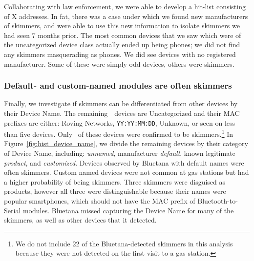 Collaborating with law
enforcement, we were able to develop a hit-list consisting of X addresses. In
fat, there was a case under which we found new manufacturers of skimmers, and
were able to use this new information to isolate skimmers we had seen 7 months
prior. The most common devices that we saw which were of the uncategorized
device class actually ended up being phones; we did not find any skimmers
masquerading as phones. We did see devices with no registered manufacturer. Some
of these were simply odd devices, others were skimmers.
\fi

\subsubsection*{Default- and custom-named modules are often skimmers} %

Finally, we investigate if skimmers can be differentiated from other devices by
their Device Name.
%
The remaining~\numberBTMACCoDfiltered~devices are Uncategorized and their MAC prefixes are either: Roving Networks, \texttt{YY:YY:MM:DD}, Unknown, or seen on less than five devices.
%
Only
\totalskimmersfirstvisit~of these devices were confirmed to be
skimmers.\footnote{We do not include 22 of the Bluetana-detected skimmers in
this analysis because they were not detected on the first visit to a gas
station.}
%
In Figure~\ref{fig:hist_device_name}, we divide the remaining devices by their
category of Device Name, including: \emph{unnamed}, manufacturer
\emph{default}, known legitimate \emph{product}, and \emph{customized}.
%
Devices observed by Bluetana with default names were often skimmers.
%
Custom named devices were not common at gas stations but had a higher
probability of being skimmers.
%
Three skimmers were disguised as products, however all three were
distinguishable because their names were popular smartphones, which should not
have the MAC prefix of Bluetooth-to-Serial modules.
%
Bluetana missed capturing the Device Name for many of the skimmers, as well as other
devices that it detected.
%
 
%


